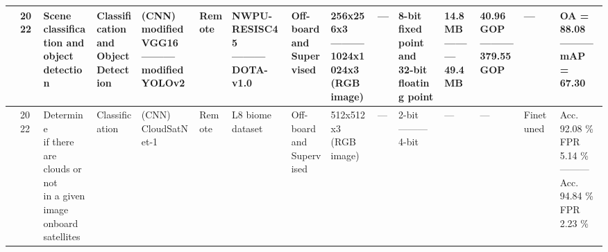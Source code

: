 \begin{center}
{\begin{tabular}{lllllllllllllll}
\cite{yanAutomaticDeploymentConvolutional2022} & 2022 & \makecell[tl]{Scene\\ classification and\\ object detection} & \makecell[tl]{Classification\\ and\\ Object\\ Detection} & \makecell[tl]{(CNN)\\ modified VGG16\\ ---------\\ modified YOLOv2} & Remote & \makecell[tl]{NWPU-RESISC45\\ ---------\\ DOTA-v1.0} & \makecell[tl]{Off-board\\ and\\ Supervised} & \makecell[tl]{256x256x3\\ ---------\\ 1024x1024x3\\ (RGB image)} & --- & \makecell[tl]{8-bit\\ fixed point\\ and\\ 32-bit\\ floating point} & \makecell[tl]{14.8 MB\\ ---------\\ 49.4 MB\\} & \makecell[tl]{40.96 GOP\\ ---------\\ 379.55 GOP} & --- & \makecell[tl]{OA = 88.08\\ ---------\\ mAP = 67.30}  \\ \hline
\cite{pitonakCloudSatNet1FPGABasedHardwareAccelerated2022} & 2022 & \makecell[tl]{Determine\\ if there are\\ clouds or not\\ in a given\\ image onboard\\ satellites} & Classification & \makecell[tl]{(CNN)\\ CloudSatNet-1} & Remote & \makecell[tl]{L8   biome\\ dataset} & \makecell[tl]{Off-board\\ and\\ Supervised} & \makecell[tl]{512x512x3\\ (RGB image)} & --- & \makecell[tl]{2-bit\\ ---------\\ 4-bit} & --- & --- & Finetuned & \makecell[tl]{Acc. 92.08 \%\\ FPR 5.14 \%\\ ---------\\ Acc. 94.84 \%\\ FPR 2.23 \%}  \\ \hline

\end{tabular}}
\end{center}
